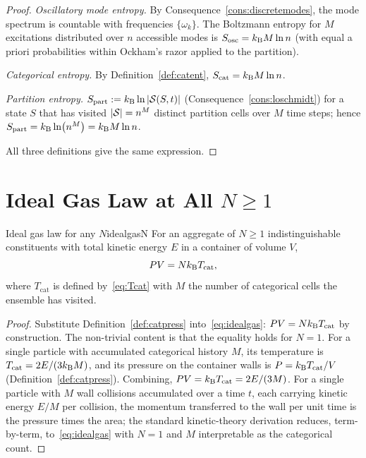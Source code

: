 \begin{proof}
\emph{Oscillatory mode entropy.} By Consequence~\ref{cons:discretemodes}, the mode spectrum is countable with frequencies $\{\omega_{k}\}$. The Boltzmann entropy for $M$ excitations distributed over $n$ accessible modes is $S_{\mathrm{osc}}=k_{\mathrm{B}} M\ln n$ (with equal a priori probabilities within Ockham's razor applied to the partition).

\emph{Categorical entropy.} By Definition~\ref{def:catent}, $S_{\mathrm{cat}}=k_{\mathrm{B}} M\ln n$.

\emph{Partition entropy.} $S_{\mathrm{part}}:=k_{\mathrm{B}}\ln|\mathcal{S}(S,t)|$ (Consequence~\ref{cons:loschmidt}) for a state $S$ that has visited $|\mathcal{S}|=n^{M}$ distinct partition cells over $M$ time steps; hence $S_{\mathrm{part}}=k_{\mathrm{B}}\ln(n^{M})=k_{\mathrm{B}} M\ln n$.

All three definitions give the same expression.
\end{proof}

\section{Ideal Gas Law at All $N\geq 1$}
\label{sec:idealgasN}

\begin{consequence}{Ideal gas law for any $N$}{idealgasN}
For an aggregate of $N\ge 1$ indistinguishable constituents with total kinetic energy $E$ in a container of volume $V$,
\begin{equation}
PV=Nk_{\mathrm{B}} T_{\mathrm{cat}},
\label{eq:idealgas}
\end{equation}
where $T_{\mathrm{cat}}$ is defined by~\eqref{eq:Tcat} with $M$ the number of categorical cells the ensemble has visited.
\end{consequence}

\begin{proof}
Substitute Definition~\ref{def:catpress} into~\eqref{eq:idealgas}: $PV=Nk_{\mathrm{B}} T_{\mathrm{cat}}$ by construction. The non-trivial content is that the equality holds for $N=1$. For a single particle with accumulated categorical history $M$, its temperature is $T_{\mathrm{cat}}=2E/(3k_{\mathrm{B}} M)$, and its pressure on the container walls is $P=k_{\mathrm{B}} T_{\mathrm{cat}}/V$ (Definition~\ref{def:catpress}). Combining, $PV=k_{\mathrm{B}} T_{\mathrm{cat}}=2E/(3M)$. For a single particle with $M$ wall collisions accumulated over a time $t$, each carrying kinetic energy $E/M$ per collision, the momentum transferred to the wall per unit time is the pressure times the area; the standard kinetic-theory derivation \citep{landaulifshitz5} reduces, term-by-term, to~\eqref{eq:idealgas} with $N=1$ and $M$ interpretable as the categorical count.
\end{proof}

